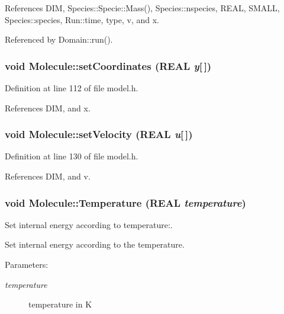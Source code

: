 References DIM, Species::Specie::Mass(), Species::nspecies, REAL, SMALL, Species::species, Run::time, type, v, and x.

Referenced by Domain::run().\hypertarget{classMolecule_5cb53332e22df64ac0367fcef3222953}{
\subsubsection[{setCoordinates}]{\setlength{\rightskip}{0pt plus 5cm}void Molecule::setCoordinates (REAL {\em y}\mbox{[}$\,$\mbox{]})}}
\label{classMolecule_5cb53332e22df64ac0367fcef3222953}




Definition at line 112 of file model.h.

References DIM, and x.\hypertarget{classMolecule_a371f10f7878c6ca91c753004a3b9df5}{
\subsubsection[{setVelocity}]{\setlength{\rightskip}{0pt plus 5cm}void Molecule::setVelocity (REAL {\em u}\mbox{[}$\,$\mbox{]})}}
\label{classMolecule_a371f10f7878c6ca91c753004a3b9df5}




Definition at line 130 of file model.h.

References DIM, and v.\hypertarget{classMolecule_3e60d33531b5e720051f41155d194e93}{
\subsubsection[{Temperature}]{\setlength{\rightskip}{0pt plus 5cm}void Molecule::Temperature (REAL {\em temperature})}}
\label{classMolecule_3e60d33531b5e720051f41155d194e93}


Set internal energy according to temperature:. 

Set internal energy according to the temperature. \begin{Desc}
\item[Parameters:]
\begin{description}
\item[{\em temperature}]temperature in K \end{description}
\end{Desc}


